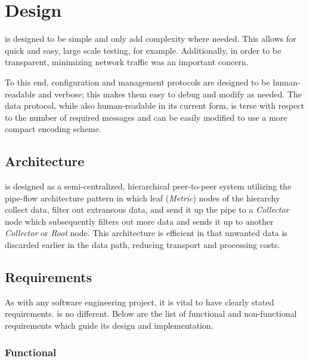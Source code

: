 \chapter{Design}
\label{design}

\dcamp is designed to be simple and only add complexity where needed. This allows for quick and easy, large scale
testing, for example. Additionally, in order to be transparent, minimizing network traffic was an important concern.

To this end, \dcamp configuration and management protocols are designed to be human-readable and verbose; this makes
them easy to debug and modify as needed. The data protocol, while also human-readable in its current form, is terse with
respect to the number of required messages and can be easily modified to use a more compact encoding scheme.

\section{Architecture}

\dcamp is designed as a semi-centralized, hierarchical peer-to-peer system utilizing the pipe-flow architecture
pattern\cite{needed} in which leaf (\textit{Metric}) nodes of the hierarchy collect data, filter out extraneous data,
and send it up the pipe to a \textit{Collector} node which subsequently filters out more data and sends it up to another
\textit{Collector} or \textit{Root} node. This architecture is efficient in that unwanted data is discarded earlier in
the data path, reducing transport and processing costs.

\section{Requirements}

As with any software engineering project, it is vital to have clearly stated requirements. \dcamp is no different. Below
are the list of functional and non-functional requirements which guide its design and implementation.

\subsection{Functional}

